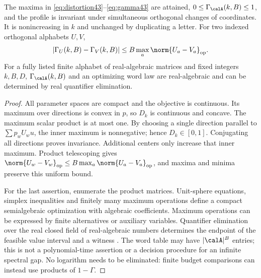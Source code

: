 \begin{proposition}\label{prop:finite-profile}
The maxima in \eqref{eq:distortion43}--\eqref{eq:gamma43} are attained, $0\le\Gamma_{\calA}(k,B)\le1$, and the profile is invariant under simultaneous orthogonal changes of coordinates. It is nonincreasing in $k$ and unchanged by duplicating a letter. For two indexed orthogonal alphabets $U,V$,
\begin{equation}\label{eq:profile-stability}
 |\Gamma_U(k,B)-\Gamma_V(k,B)|
             \le B\max_{a}\norm{U_a-V_a}_{\mathrm{op}}.
\end{equation}
For a fully listed finite alphabet of real-algebraic matrices and fixed integers $k,B,D$, $\Gamma_{\calA}(k,B)$ and an optimizing word law are real-algebraic and can be determined by real quantifier elimination.
\end{proposition}
\begin{proof}
All parameter spaces are compact and the objective is continuous. Its maximum over directions is convex in $p$, so $D_k$ is continuous and concave. The maximum scalar product is at most one. By choosing a single direction parallel to $\sum p_w U_wu$, the inner maximum is nonnegative; hence $D_k\in[0,1]$. Conjugating all directions proves invariance. Additional centers only increase that inner maximum. Product telescoping gives $\norm{U_w-V_w}_{\mathrm{op}}\le B\max_a\norm{U_a-V_a}_{\mathrm{op}}$, and maxima and minima preserve this uniform bound.

For the last assertion, enumerate the product matrices. Unit-sphere equations, simplex inequalities and finitely many maximum operations define a compact semialgebraic optimization with algebraic coefficients. Maximum operations can be expressed by finite alternatives or auxiliary variables. Quantifier elimination over the real closed field of real-algebraic numbers determines the endpoint of the feasible value interval and a witness \cite{BPR}. The word table may have $|\calA|^B$ entries; this is not a polynomial-time assertion or a decision procedure for an infinite spectral gap. No logarithm needs to be eliminated: finite budget comparisons can instead use products of $1-\Gamma$.
\end{proof}

